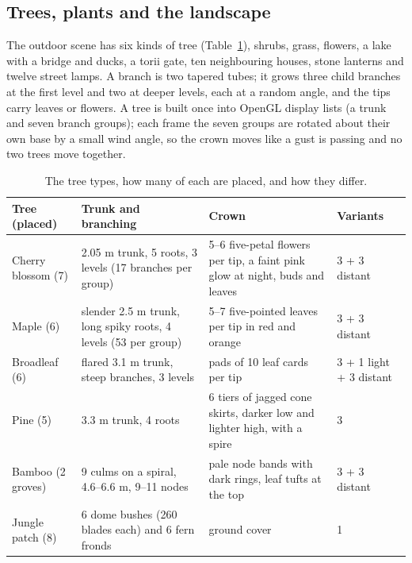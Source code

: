 \documentclass[10pt,a4paper]{article}
\begin{document}
\subsection{Trees, plants and the landscape}
The outdoor scene has six kinds of tree (Table~\ref{tab:trees}), shrubs, grass, flowers, a lake with a bridge and ducks, a torii gate, ten neighbouring houses, stone lanterns and twelve street lamps. A branch is two tapered tubes; it grows three child branches at the first level and two at deeper levels, each at a random angle, and the tips carry leaves or flowers. A tree is built once into OpenGL display lists (a trunk and seven branch groups); each frame the seven groups are rotated about their own base by a small wind angle, so the crown moves like a gust is passing and no two trees move together.
\begin{table}[htbp]
\centering\footnotesize
\begin{tabular}{@{}p{2.5cm}p{4.6cm}p{5.7cm}p{2.7cm}@{}}
\toprule
\textbf{Tree (placed)} & \textbf{Trunk and branching} & \textbf{Crown} & \textbf{Variants}\\
\midrule
Cherry blossom (7) & 2.05 m trunk, 5 roots, 3 levels (17 branches per group) & 5--6 five-petal flowers per tip, a faint pink glow at night, buds and leaves & 3 + 3 distant\\
Maple (6) & slender 2.5 m trunk, long spiky roots, 4 levels (53 per group) & 5--7 five-pointed leaves per tip in red and orange & 3 + 3 distant\\
Broadleaf (6) & flared 3.1 m trunk, steep branches, 3 levels & pads of 10 leaf cards per tip & 3 + 1 light + 3 distant\\
Pine (5) & 3.3 m trunk, 4 roots & 6 tiers of jagged cone skirts, darker low and lighter high, with a spire & 3\\
Bamboo (2 groves) & 9 culms on a spiral, 4.6--6.6 m, 9--11 nodes & pale node bands with dark rings, leaf tufts at the top & 3 + 3 distant\\
Jungle patch (8) & 6 dome bushes (260 blades each) and 6 fern fronds & ground cover & 1\\
\bottomrule
\end{tabular}
\caption{The tree types, how many of each are placed, and how they differ.}\label{tab:trees}
\end{table}
\end{document}
